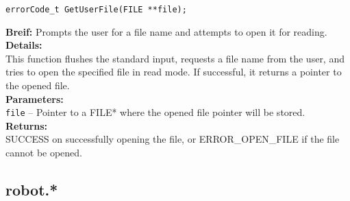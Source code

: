 \begin{verbatim}
errorCode_t GetUserFile(FILE **file);
\end{verbatim}
\textbf{Breif:} Prompts the user for a file name and attempts to open it for reading. \\
\textbf{Details:} \\
\hspace*{1cm}This function flushes the standard input, requests a file name from the user, and tries to open the specified file in read mode. If successful, it returns a pointer to the opened file. \\
\textbf{Parameters:} \\
\hspace*{1cm}\texttt{file} -- Pointer to a FILE* where the opened file pointer will be stored. \\
\textbf{Returns:} \\
\hspace*{1cm}SUCCESS on successfully opening the file, or ERROR\_OPEN\_FILE if the file cannot be opened. \\[1em]


\subsection{robot.*}



